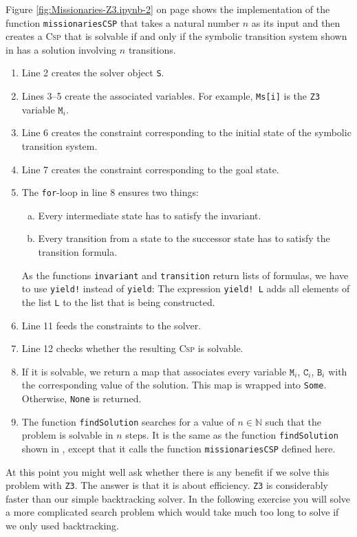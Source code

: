 Figure \ref{fig:Missionaries-Z3.ipynb-2} on page \pageref{fig:Missionaries-Z3.ipynb-2} shows the implementation
of the function \texttt{missionariesCSP} that takes a natural number $n$ as its input and then creates a
\textsc{Csp} that is solvable if and only if the symbolic transition system shown in
 has a solution involving $n$ transitions.
\begin{enumerate}
\item Line 2 creates the solver object \texttt{S}.
\item Lines 3--5 create the associated variables.  For example, \texttt{Ms[i]} is the \texttt{Z3} variable
      $\mathtt{M}_i$.
\item Line 6 creates the constraint corresponding to the initial state of the symbolic transition system.
\item Line 7 creates the constraint corresponding to the goal state.
\item The \texttt{for}-loop in line 8 ensures two things:
  \begin{enumerate}[(a)]
  \item Every intermediate state has to satisfy the invariant.
  \item Every transition from a state to the successor state has to satisfy the transition formula.
  \end{enumerate}
  As the functions \texttt{invariant} and \texttt{transition} return lists of formulas, we have to use
  \texttt{yield!} instead of \texttt{yield}:  The expression \texttt{yield! L} adds all elements of the list
  \texttt{L} to the list that is being constructed.
\item Line 11 feeds the constraints to the solver.
\item Line 12 checks whether the resulting \textsc{Csp} is solvable.
\item If it is solvable, we return a map that associates every variable $\texttt{M}_i$,  $\texttt{C}_i$,
      $\texttt{B}_i$ with the corresponding value of the solution.  This map is wrapped into \texttt{Some}.
      Otherwise, \texttt{None} is returned.
\item The function \texttt{findSolution} searches for a value of $n \in \mathbb{N}$ such that the problem is
      solvable in $n$ steps.  It is the same as the function \texttt{findSolution} shown in
      , except that it calls the function \texttt{missionariesCSP} defined here.
\end{enumerate}
At this point you might well ask whether there is any benefit if we solve this problem with \texttt{Z3}.  The
answer is that it is about efficiency.  \texttt{Z3} is considerably faster than our simple backtracking solver.
In the following exercise you will
solve a more complicated search problem which would take much too long to solve if we only used backtracking.
\pagebreak
\vspace*{\fill}


